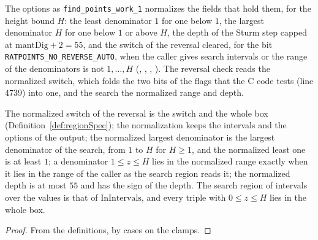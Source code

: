 \begin{definition}\label{def:normalize}
  \leanok
  The options as \verb|find_points_work_1| normalizes the fields that hold them, for the height
  bound $H$: the least denominator $1$ for one below $1$, the largest denominator $H$ for one below
  $1$ or above $H$, the depth of the Sturm step capped at $\mathrm{mantDig} + 2 = 55$, and the
  switch of the reversal cleared, for the bit \verb|RATPOINTS_NO_REVERSE_AUTO|, when the caller
  gives search intervals or the range of the denominators is not $1, \dots, H$
  (, ,
  , ). The reversal check reads
  the normalized switch, which folds the two bits of the flags that the C code tests (line 4739)
  into one, and the search the normalized range and depth.
\end{definition}

\begin{lemma}\label{lem:normalize}
  \leanok
  The normalized switch of the reversal is the switch and the whole box
  (Definition~\ref{def:regionSpec}); the normalization keeps the intervals and the options of the
  output; the normalized largest denominator is the largest denominator of the search, from $1$ to
  $H$ for $H \ge 1$, and the normalized least one is at least $1$; a denominator $1 \le z \le H$
  lies in the normalized range exactly when it lies in the range of the caller as the search region
  reads it; the normalized depth is at most $55$ and has the sign of the depth. The search region of
  intervals over the values is that of $\mathrm{InIntervals}$, and every triple with $0 \le z \le H$
  lies in the whole box.
\end{lemma}

\begin{proof}
  \leanok
  From the definitions, by cases on the clamps.
\end{proof}

